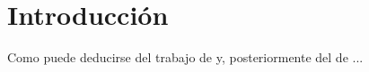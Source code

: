 

\chapter{Introducción}
\label{cha:introduccion}

\ifpdf
    \graphicspath{{1_introduccion/figures/PNG/}{1_introduccion/figures/PDF/}{1_introduccion/figures/}}
\else
    \graphicspath{{1_introduccion/figures/EPS/}{1_introduccion/figures/}}
\fi


Como puede deducirse del trabajo de \cite{Bailey} y, posteriormente del de
\cite{Ta}... 



